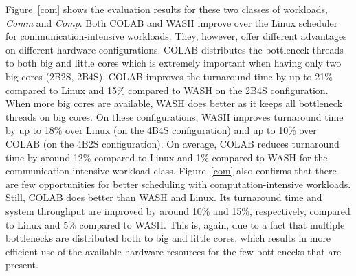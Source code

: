 Figure~\ref{com} shows the evaluation results for these two classes of workloads, \emph{Comm} and \emph{Comp}. Both COLAB and WASH improve over the Linux scheduler for communication-intensive workloads. They, however, offer different advantages on different hardware configurations. COLAB distributes the bottleneck threads to both big and little cores which is extremely important when having only two big cores (2B2S, 2B4S). COLAB improves the turnaround time by up to 21\% compared to Linux and 15\% compared to WASH on the 2B4S configuration. When more big cores are available, WASH does better as it keeps all bottleneck threads on big cores. On these configurations, WASH improves turnaround time by up to 18\% over Linux (on the 4B4S configuration) and up to 10\% over COLAB (on the 4B2S configuration). On average, COLAB reduces turnaround time by around 12\% compared to Linux and 1\% compared to WASH for the communication-intensive workload class.
Figure~\ref{com} also confirms that there are few opportunities for better scheduling with computation-intensive workloads. Still, COLAB does better than WASH and Linux. Its turnaround time and system throughput are improved by around 10\% and 15\%, respectively, compared to Linux and 5\% compared to WASH. This is, again, due to a fact that multiple bottlenecks are distributed both to big and little cores, which results in more efficient use of the available hardware resources for the few bottlenecks that are present.

